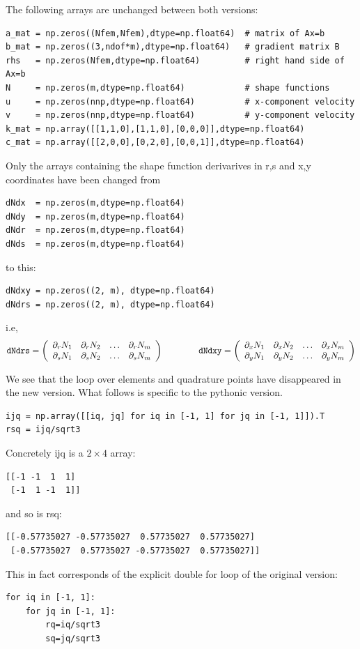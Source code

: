 The following arrays are unchanged between both versions:

\begin{lstlisting}
a_mat = np.zeros((Nfem,Nfem),dtype=np.float64)  # matrix of Ax=b
b_mat = np.zeros((3,ndof*m),dtype=np.float64)   # gradient matrix B 
rhs   = np.zeros(Nfem,dtype=np.float64)         # right hand side of Ax=b
N     = np.zeros(m,dtype=np.float64)            # shape functions
u     = np.zeros(nnp,dtype=np.float64)          # x-component velocity
v     = np.zeros(nnp,dtype=np.float64)          # y-component velocity
k_mat = np.array([[1,1,0],[1,1,0],[0,0,0]],dtype=np.float64) 
c_mat = np.array([[2,0,0],[0,2,0],[0,0,1]],dtype=np.float64) 
\end{lstlisting}

Only the arrays containing the shape function derivarives in r,s and x,y
coordinates have been changed from 

\begin{lstlisting}
dNdx  = np.zeros(m,dtype=np.float64)   
dNdy  = np.zeros(m,dtype=np.float64)    
dNdr  = np.zeros(m,dtype=np.float64)     
dNds  = np.zeros(m,dtype=np.float64)       
\end{lstlisting}
 
to this:

\begin{lstlisting}
dNdxy = np.zeros((2, m), dtype=np.float64)  
dNdrs = np.zeros((2, m), dtype=np.float64)  
\end{lstlisting}

i.e,
\[
{\tt dNdrs} = 
\left(
\begin{array}{cccc}
\partial_r N_1 & \partial_r N_2 & \dots & \partial_r N_m \\ 
\partial_s N_1 & \partial_s N_2 & \dots & \partial_s N_m 
\end{array}
\right)
\qquad
\qquad
{\tt dNdxy} = 
\left(
\begin{array}{cccc}
\partial_x N_1 & \partial_x N_2 & \dots & \partial_x N_m \\ 
\partial_y N_1 & \partial_y N_2 & \dots & \partial_y N_m 
\end{array}
\right)
\]

We see that the loop over elements and quadrature points have disappeared in the new version. 
What follows is specific to the pythonic version. 

\begin{lstlisting}
ijq = np.array([[iq, jq] for iq in [-1, 1] for jq in [-1, 1]]).T
rsq = ijq/sqrt3
\end{lstlisting}
Concretely ijq is a $2\times 4$ array:
\begin{verbatim}
[[-1 -1  1  1]
 [-1  1 -1  1]]
\end{verbatim}
and so is rsq:
\begin{verbatim}
[[-0.57735027 -0.57735027  0.57735027  0.57735027]
 [-0.57735027  0.57735027 -0.57735027  0.57735027]]
\end{verbatim}
This in fact corresponds of the explicit double for loop of the original version:
\begin{lstlisting}
for iq in [-1, 1]:
    for jq in [-1, 1]:
        rq=iq/sqrt3
        sq=jq/sqrt3
\end{lstlisting}


